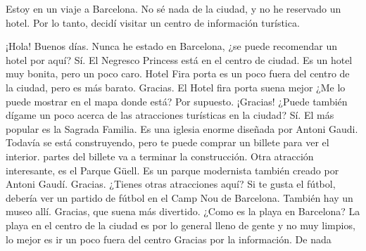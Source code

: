 Estoy en un viaje a Barcelona. No sé nada de la ciudad, y no he reservado un hotel. Por lo tanto, decidí visitar un centro de información turística.

¡Hola! Buenos días. Nunca he estado en Barcelona, ¿se puede recomendar un hotel por aquí?
Sí. El Negresco Princess está en el centro de ciudad. Es un hotel muy bonita, pero un poco caro. Hotel Fira porta es un poco fuera del centro de la ciudad, pero es más barato.
Gracias. El Hotel fira porta suena mejor ¿Me lo puede mostrar en el mapa donde está?
Por supuesto.
¡Gracias! ¿Puede también dígame un poco acerca de las atracciones turísticas en la ciudad?
Sí. El más popular es la Sagrada Familia. Es una iglesia enorme diseñada por Antoni Gaudi. Todavía se está construyendo, pero te puede comprar un billete para ver el interior. partes del billete va a terminar la construcción.
Otra atracción interesante, es el Parque Güell.  Es un parque modernista también creado por Antoni Gaudí. 
Gracias. ¿Tienes otras atracciones aquí?
Si te gusta el fútbol, debería ver un partido de fútbol en el Camp Nou de Barcelona. También hay un museo allí.
Gracias, que suena más divertido. ¿Como es la playa en Barcelona?
La playa en el centro de la ciudad es por lo general lleno de gente y no muy limpios, lo mejor es ir un poco fuera del centro
Gracias por la información.
De nada
